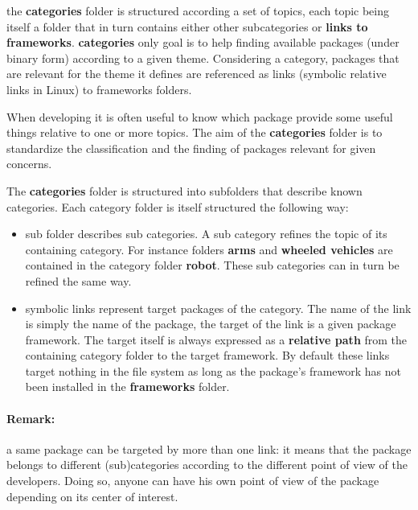 \documentclass[12pt,a4paper]{article}
\begin{document}
the \textbf{categories} folder is structured according a set of topics, each topic being itself a folder that in turn contains either other subcategories or \textbf{links to frameworks}. \textbf{categories} only goal is to help finding available packages (under binary form) according to a given theme. Considering a category, packages that are relevant for the theme it defines are referenced as links (symbolic relative links in Linux) to frameworks folders.

When developing it is often useful to know which package provide some useful things relative to one or more topics. The aim of the \textbf{categories} folder is to standardize the classification and the finding of packages relevant for given concerns.

The \textbf{categories} folder is structured into subfolders that describe known categories. Each category folder is itself structured the following way:
\begin{itemize}
\item sub folder describes sub categories. A sub category refines the topic of its containing category. For instance folders \textbf{arms} and \textbf{wheeled vehicles} are contained in the category folder \textbf{robot}. These sub categories can in turn be refined the same way.
\item symbolic links represent target packages of the category. The name of the link is simply the name of the package, the target of the link is a given package framework. The target itself is always expressed as a \textbf{relative path} from the containing category folder to the target framework. By default these links target nothing in the file system as long as the package's framework has not been installed in the \textbf{frameworks} folder.
\end{itemize}

\paragraph*{Remark:} 
a same package can be targeted by more than one link: it means that the package belongs to different (sub)categories according to the different point of view of the developers. Doing so, anyone can have his own point of view of the package depending on its center of interest.
\linebreak
\end{document}
